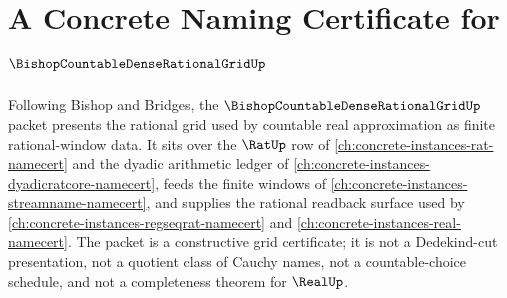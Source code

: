 \chapter{A Concrete Naming Certificate for $\BishopCountableDenseRationalGridUp$}
\label{ch:concrete-instances-bishop-countable-dense-rational-grid-namecert}

Following Bishop and Bridges, the $\BishopCountableDenseRationalGridUp$ packet presents the rational grid used by countable real approximation as finite rational-window data. It sits over the $\RatUp$ row of \autoref{ch:concrete-instances-rat-namecert} and the dyadic arithmetic ledger of \autoref{ch:concrete-instances-dyadicratcore-namecert}, feeds the finite windows of \autoref{ch:concrete-instances-streamname-namecert}, and supplies the rational readback surface used by \autoref{ch:concrete-instances-regseqrat-namecert} and \autoref{ch:concrete-instances-real-namecert}. The packet is a constructive grid certificate; it is not a Dedekind-cut presentation, not a quotient class of Cauchy names, not a countable-choice schedule, and not a completeness theorem for $\RealUp$.

